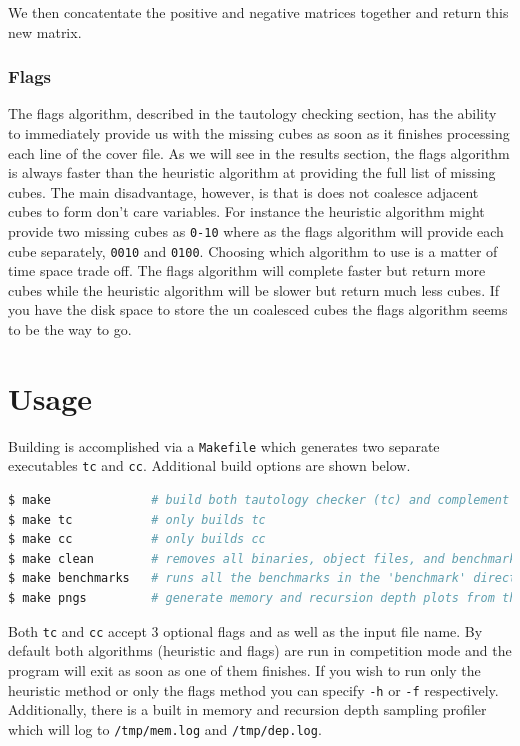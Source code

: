 \documentclass[10pt]{article}
\begin{document}
            We then concatentate the positive and negative matrices together and
            return this new matrix.

        \subsubsection{Flags}

            The flags algorithm, described in the tautology checking section,
            has the ability to immediately provide us with the missing cubes as
            soon as it finishes processing each line of the cover file. As we
            will see in the results section, the flags algorithm is always
            faster than the heuristic algorithm at providing the full list of
            missing cubes. The main disadvantage, however, is that is does not
            coalesce adjacent cubes to form don't care variables. For instance
            the heuristic algorithm might provide two missing cubes as
            \texttt{0-10} where as the flags algorithm will provide each cube
            separately, \texttt{0010} and \texttt{0100}. Choosing which
            algorithm to use is a matter of time space trade off. The flags
            algorithm will complete faster but return more cubes while the
            heuristic algorithm will be slower but return much less cubes. If
            you have the disk space to store the un coalesced cubes the flags
            algorithm seems to be the way to go.

\newpage
\section{Usage}

Building is accomplished via a \texttt{Makefile} which generates two separate
executables \texttt{tc} and \texttt{cc}. Additional build options are shown
below.

\begin{lstlisting}[language=bash]
$ make              # build both tautology checker (tc) and complement checker (cc)
$ make tc           # only builds tc
$ make cc           # only builds cc
$ make clean        # removes all binaries, object files, and benchmark results
$ make benchmarks   # runs all the benchmarks in the 'benchmark' directory
$ make pngs         # generate memory and recursion depth plots from the benchmark results
\end{lstlisting}

Both \texttt{tc} and \texttt{cc} accept 3 optional flags and as well as the
input file name.  By default both algorithms (heuristic and flags) are run in
competition mode and the program will exit as soon as one of them finishes. If
you wish to run only the heuristic method or only the flags method you can
specify \texttt{-h} or \texttt{-f} respectively. Additionally, there is a built
in memory and recursion depth sampling profiler which will log to
\texttt{/tmp/mem.log} and \texttt{/tmp/dep.log}.
\end{document}
